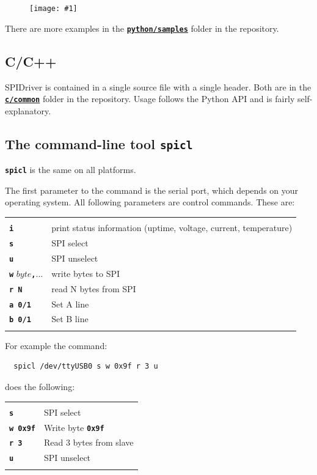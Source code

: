 \documentclass{article}
\newcommand{\png}[1]{
\begin{figure}[H]
\begin{center}
\texttt{[image: \#1]}
\end{center}
\end{figure}
}
\newcommand{\mach}[1]{\texttt{\textbf{#1}}}
\newcommand{\gap}{\vspace{10pt}}
\begin{document}
\png{img/spidriver/spidriver-gui-linux}

There are more examples in the 
\href{https://github.com/jamesbowman/spidriver/tree/master/python/samples}{\mach{python/samples}} folder in the repository.

\subsection{C/C++}

SPIDriver is contained in a single source file with a single header.
Both are in the
\href{https://github.com/jamesbowman/spidriver/tree/master/c/common}{\mach{c/common}} folder in the repository.
Usage follows the Python API and is fairly self-explanatory.

\subsection{The command-line tool \mach{spicl}}

\mach{spicl} is the same on all platforms.

The first parameter to the command is the serial port, which depends on your operating system.
All following parameters are control commands. These are:

\gap\begin{tabular}{ll}
\hline \\
  \mach{i}     & print status information (uptime, voltage, current, temperature) \\
  \mach{s}     & SPI select \\
  \mach{u}     & SPI unselect \\
  \mach{w} $byte$\mach{,}...     & write bytes to SPI \\
  \mach{r N}   & read N bytes from SPI \\
  \mach{a 0/1} & Set A line \\
  \mach{b 0/1} & Set B line \\
\hline \\
\end{tabular}
\gap

For example the command:

\begin{lstlisting}
  spicl /dev/ttyUSB0 s w 0x9f r 3 u
\end{lstlisting}

does the following:

\gap\begin{tabular}{ll}
\hline \\
 \mach{s}       & SPI select \\
 \mach{w 0x9f}  & Write byte \mach{0x9f} \\
 \mach{r 3}     & Read 3 bytes from slave \\
 \mach{u}       & SPI unselect \\
\hline \\
\end{tabular}
\end{document}
